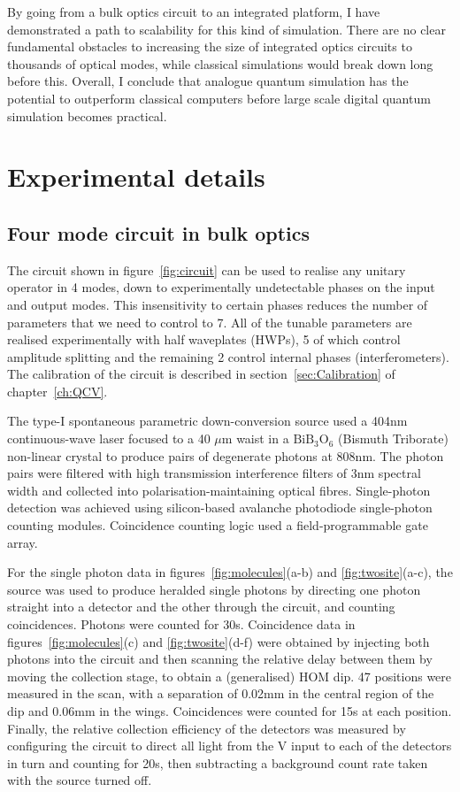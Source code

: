 By going from a bulk optics circuit to an integrated platform, I have
demonstrated a path to scalability for this kind of simulation. There are no
clear fundamental obstacles to increasing the size of integrated optics circuits
to thousands of optical modes, while classical simulations would break down long
before this. Overall, I conclude that analogue quantum simulation has the
potential to outperform classical computers before large scale digital quantum
simulation becomes practical.

\section{Experimental details}
\label{sec:SimulationExperiment}
\subsection{Four mode circuit in bulk optics}
The circuit shown in figure~\ref{fig:circuit} can be used to realise any
unitary operator in 4 modes, down to experimentally undetectable phases on the
input and output modes. This insensitivity to certain phases reduces the number
of parameters that we need to control to 7. All of the tunable parameters are
realised experimentally with half waveplates (HWPs), 5 of which control
amplitude splitting and the remaining 2 control internal phases
(interferometers). The calibration of the circuit is described in
section~\ref{sec:Calibration} of chapter~\ref{ch:QCV}.

The type-I spontaneous parametric down-conversion source used a 404nm
continuous-wave laser focused to a 40 \(\mu\)m waist in a \(\text{BiB}_3
\text{O}_6\) (Bismuth Triborate) non-linear crystal to produce pairs of
degenerate photons at 808nm. The photon pairs were filtered with high
transmission interference filters of 3nm spectral width and collected into
polarisation-maintaining optical fibres. Single-photon detection was achieved
using silicon-based avalanche photodiode single-photon counting modules.
Coincidence counting logic used a field-programmable gate array.

For the single photon data in figures~\ref{fig:molecules}(a-b) and
\ref{fig:twosite}(a-c), the source was used to produce heralded single photons
by directing one photon straight into a detector and the other through the
circuit, and counting coincidences. Photons were counted for 30s. Coincidence
data in figures~\ref{fig:molecules}(c) and \ref{fig:twosite}(d-f) were obtained
by injecting both photons into the circuit and then scanning the relative delay
between them by moving the collection stage, to obtain a (generalised) HOM dip.
47 positions were measured in the scan, with a separation of 0.02mm in the
central region of the dip and 0.06mm in the wings. Coincidences were counted for
15s at each position. Finally, the relative collection efficiency of the
detectors was measured by configuring the circuit to direct all light from the
V input to each of the detectors in turn and counting for 20s, then subtracting
a background count rate taken with the source turned off.


